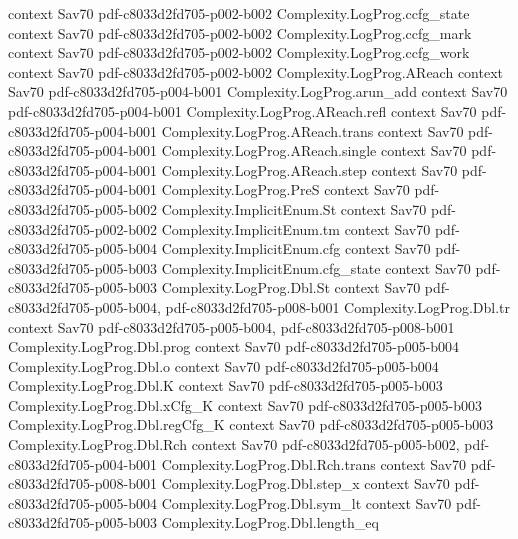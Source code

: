 \begin{theorem}
  {context}
  {Sav70}
  {pdf-c8033d2fd705-p002-b002}
\proofstep
  {Complexity.LogProg.ccfg_state}
  {context}
  {Sav70}
  {pdf-c8033d2fd705-p002-b002}
\proofstep
  {Complexity.LogProg.ccfg_mark}
  {context}
  {Sav70}
  {pdf-c8033d2fd705-p002-b002}
\proofstep
  {Complexity.LogProg.ccfg_work}
  {context}
  {Sav70}
  {pdf-c8033d2fd705-p002-b002}
\proofstep
  {Complexity.LogProg.AReach}
  {context}
  {Sav70}
  {pdf-c8033d2fd705-p004-b001}
\proofstep
  {Complexity.LogProg.arun_add}
  {context}
  {Sav70}
  {pdf-c8033d2fd705-p004-b001}
\proofstep
  {Complexity.LogProg.AReach.refl}
  {context}
  {Sav70}
  {pdf-c8033d2fd705-p004-b001}
\proofstep
  {Complexity.LogProg.AReach.trans}
  {context}
  {Sav70}
  {pdf-c8033d2fd705-p004-b001}
\proofstep
  {Complexity.LogProg.AReach.single}
  {context}
  {Sav70}
  {pdf-c8033d2fd705-p004-b001}
\proofstep
  {Complexity.LogProg.AReach.step}
  {context}
  {Sav70}
  {pdf-c8033d2fd705-p004-b001}
\proofstep
  {Complexity.LogProg.PreS}
  {context}
  {Sav70}
  {pdf-c8033d2fd705-p005-b002}
\proofstep
  {Complexity.ImplicitEnum.St}
  {context}
  {Sav70}
  {pdf-c8033d2fd705-p002-b002}
\proofstep
  {Complexity.ImplicitEnum.tm}
  {context}
  {Sav70}
  {pdf-c8033d2fd705-p005-b004}
\proofstep
  {Complexity.ImplicitEnum.cfg}
  {context}
  {Sav70}
  {pdf-c8033d2fd705-p005-b003}
\proofstep
  {Complexity.ImplicitEnum.cfg_state}
  {context}
  {Sav70}
  {pdf-c8033d2fd705-p005-b003}
\proofstep
  {Complexity.LogProg.Dbl.St}
  {context}
  {Sav70}
  {pdf-c8033d2fd705-p005-b004,
    pdf-c8033d2fd705-p008-b001}
\proofstep
  {Complexity.LogProg.Dbl.tr}
  {context}
  {Sav70}
  {pdf-c8033d2fd705-p005-b004,
    pdf-c8033d2fd705-p008-b001}
\proofstep
  {Complexity.LogProg.Dbl.prog}
  {context}
  {Sav70}
  {pdf-c8033d2fd705-p005-b004}
\proofstep
  {Complexity.LogProg.Dbl.o}
  {context}
  {Sav70}
  {pdf-c8033d2fd705-p005-b004}
\proofstep
  {Complexity.LogProg.Dbl.K}
  {context}
  {Sav70}
  {pdf-c8033d2fd705-p005-b003}
\proofstep
  {Complexity.LogProg.Dbl.xCfg_K}
  {context}
  {Sav70}
  {pdf-c8033d2fd705-p005-b003}
\proofstep
  {Complexity.LogProg.Dbl.regCfg_K}
  {context}
  {Sav70}
  {pdf-c8033d2fd705-p005-b003}
\proofstep
  {Complexity.LogProg.Dbl.Rch}
  {context}
  {Sav70}
  {pdf-c8033d2fd705-p005-b002,
    pdf-c8033d2fd705-p004-b001}
\proofstep
  {Complexity.LogProg.Dbl.Rch.trans}
  {context}
  {Sav70}
  {pdf-c8033d2fd705-p008-b001}
\proofstep
  {Complexity.LogProg.Dbl.step_x}
  {context}
  {Sav70}
  {pdf-c8033d2fd705-p005-b004}
\proofstep
  {Complexity.LogProg.Dbl.sym_lt}
  {context}
  {Sav70}
  {pdf-c8033d2fd705-p005-b003}
\proofstep
  {Complexity.LogProg.Dbl.length_eq}

\end{theorem}
